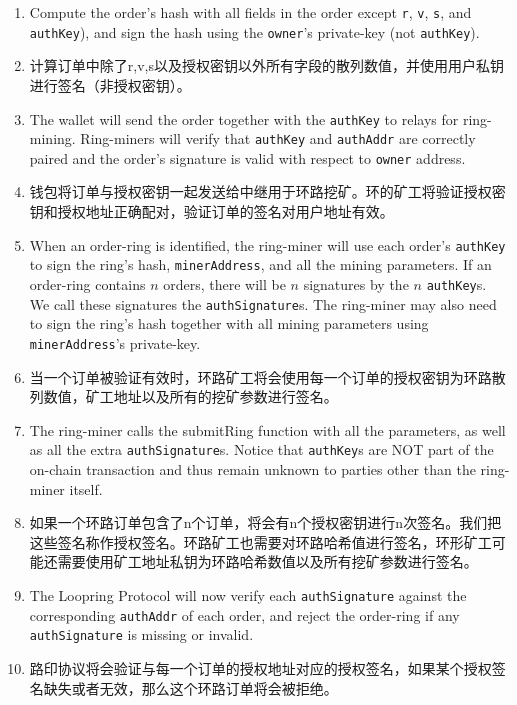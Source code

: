 \documentclass[UTF8,nofonts]{ctexart}
\begin{document}
\begin{multicols}{2}
\begin{enumerate}
	\item Compute the order's hash with all fields in the order except \verb|r|, \verb|v|, \verb|s|, and \verb|authKey|), and sign the hash using the \verb|owner|'s private-key (not \verb|authKey|).
	\item 计算订单中除了r,v,s以及授权密钥以外所有字段的散列数值，并使用用户私钥进行签名（非授权密钥）。


	\item The wallet will send the order together with the \verb|authKey| to  relays for ring-mining. Ring-miners will verify that \verb|authKey| and \verb|authAddr| are correctly paired and the order's signature is valid with respect to \verb|owner| address.
	\item 钱包将订单与授权密钥一起发送给中继用于环路挖矿。环的矿工将验证授权密钥和授权地址正确配对，验证订单的签名对用户地址有效。


	\item When an order-ring is identified, the ring-miner will use each order's \verb|authKey| to sign the ring's hash, \verb|minerAddress|, and all the mining parameters. If an order-ring contains $n$ orders, there will be $n$ signatures by the $n$ \verb|authKey|s. We call these signatures the \verb|authSignature|s. The ring-miner may also need to sign the ring's hash together with all mining parameters using \verb|minerAddress|'s private-key.
	\item 当一个订单被验证有效时，环路矿工将会使用每一个订单的授权密钥为环路散列数值，矿工地址以及所有的挖矿参数进行签名。


	\item The ring-miner calls the submitRing function with all the parameters, as well as all the extra \verb|authSignature|s. Notice that \verb|authKey|s are NOT part of the on-chain transaction and thus remain unknown to parties other than the ring-miner itself.
	\item 如果一个环路订单包含了n个订单，将会有n个授权密钥进行n次签名。我们把这些签名称作授权签名。环路矿工也需要对环路哈希值进行签名，环形矿工可能还需要使用矿工地址私钥为环路哈希数值以及所有挖矿参数进行签名。


	\item The Loopring Protocol will now verify each \verb|authSignature| against the corresponding \verb|authAddr| of each order, and reject the order-ring if any \verb|authSignature| is missing or invalid.
	\item 路印协议将会验证与每一个订单的授权地址对应的授权签名，如果某个授权签名缺失或者无效，那么这个环路订单将会被拒绝。


\end{enumerate}
\end{multicols}
\end{document}
